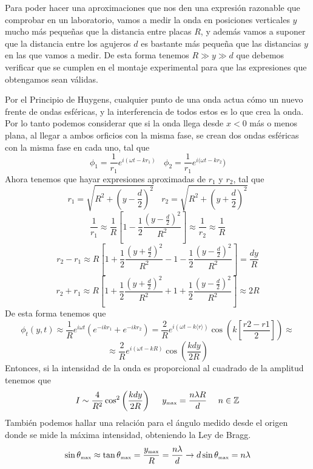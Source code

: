 Para poder hacer una aproximaciones que nos den una expresión razonable que comprobar en un laboratorio, vamos a medir la onda en posiciones verticales $y$ mucho más pequeñas que la distancia entre placas $R$, y además vamos a suponer que la distancia entre los agujeros $d$ es bastante más pequeña que las distancias $y$ en las que vamos a medir. De esta forma tenemos $R \gg y \gg d$ que debemos verificar que se cumplen en el montaje experimental para que las expresiones que obtengamos sean válidas.

\newpage
Por el Principio de Huygens, cualquier punto de una onda actua cómo un nuevo frente de ondas esféricas, y la interferencia de todos estos es lo que crea la onda. Por lo tanto podemos considerar que si la onda llega desde $x<0$ más o menos plana, al llegar a ambos orficios con la misma fase, se crean dos ondas esféricas con la misma fase en cada uno, tal que
\[\phi_1 = \frac{1}{r_1} e^{i(\omega t -kr_1)} \ \ \ \ \phi_2 = \frac{1}{r_1} e^{i(\omega t -kr_2})\]
Ahora tenemos que hayar expresiones aproximadas de $r_1$ y $r_2$, tal que 
\[r_1=\sqrt{R^2+\left(y-\frac{d}{2}\right)^2} \ \ \ \ r_2=\sqrt{R^2+\left(y+\frac{d}{2}\right)^2}\]
\[\frac{1}{r_1} \approx \frac{1}{R}\left[1-\frac{1}{2} \frac{\left(y-\frac{d}{2}\right)^2}{R^2}\right] \approx \frac{1}{r_2} \approx \frac{1}{R}\]
\[r_2-r_1 \approx R\left[1+\frac{1}{2}\frac{\left(y+\frac{d}{2}\right)^2}{R^2}-1-\frac{1}{2}\frac{\left(y-\frac{d}{2}\right)^2}{R^2}\right]= \frac{dy}{R}\]
\[r_2+r_1 \approx R\left[1+\frac{1}{2}\frac{\left(y+\frac{d}{2}\right)^2}{R^2}+1+\frac{1}{2}\frac{\left(y-\frac{d}{2}\right)^2}{R^2}\right]\approx 2R\]
De esta forma tenemos que 
\[\phi_t (y,t) \approx \frac{1}{R}e^{i\omega t}\left(e^{-ikr_1}+e^{-ikr_2}\right) = \frac{2}{R}e^{i(\omega t-k\langle r\rangle )} \cos\left(k \left[\frac{r2-r1}{2}\right]\right) \approx\]
\begin{equation} \label{6.1.1}
    \approx \frac{2}{R}e^{i(\omega t-kR)} \cos\left(\frac{kdy}{2R}\right)
\end{equation}
Entonces, si la intensidad de la onda es proporcional al cuadrado de la amplitud tenemos que 
\begin{equation} \label{6.1.1}
    I \sim \frac{4}{R^2}\cos^2\left(\frac{kdy}{2R}\right) \ \ \ \ y_{\mbox{\tiny max}} = \frac{n\lambda R}{d} \ \ \ \ n \in \mathbb{Z}
\end{equation}
También podemos hallar una relación para el ángulo medido desde el origen donde se mide la máxima intensidad, obteniendo la Ley de Bragg.
\begin{equation} \label{6.1.1}
    \sin \theta_{\mbox{\tiny max}} \approx \tan \theta_{\mbox{\tiny max}} = \frac{y_{\mbox{\tiny max}}}{R} = \frac{n\lambda}{d} \rightarrow d \sin \theta_{\mbox{\tiny max}} = n\lambda
\end{equation}
